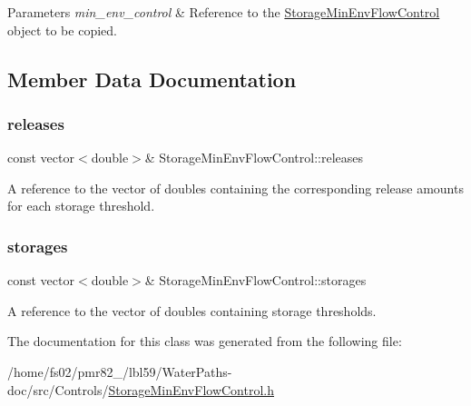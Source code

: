 \begin{DoxyParams}{Parameters}
{\em min\+\_\+env\+\_\+control} & Reference to the {\ttfamily \mbox{\hyperlink{classStorageMinEnvFlowControl}{Storage\+Min\+Env\+Flow\+Control}}} object to be copied. \\
\hline
\end{DoxyParams}


\subsection{Member Data Documentation}
\mbox{\label{classStorageMinEnvFlowControl_af187563525a0b5b437d27134bff34646}} 
\subsubsection{\texorpdfstring{releases}{releases}}
{\footnotesize\ttfamily const vector$<$double$>$\& Storage\+Min\+Env\+Flow\+Control\+::releases}



A reference to the vector of doubles containing the corresponding release amounts for each storage threshold. 

\mbox{\label{classStorageMinEnvFlowControl_af68170e5f561f1bfc2062f9e6ec8dd6d}} 
\subsubsection{\texorpdfstring{storages}{storages}}
{\footnotesize\ttfamily const vector$<$double$>$\& Storage\+Min\+Env\+Flow\+Control\+::storages}



A reference to the vector of doubles containing storage thresholds. 



The documentation for this class was generated from the following file\+:\begin{DoxyCompactItemize}
\item 
/home/fs02/pmr82\+\_/lbl59/\+Water\+Paths-\/doc/src/\+Controls/\mbox{\hyperlink{StorageMinEnvFlowControl_8h}{Storage\+Min\+Env\+Flow\+Control.\+h}}\end{DoxyCompactItemize}
